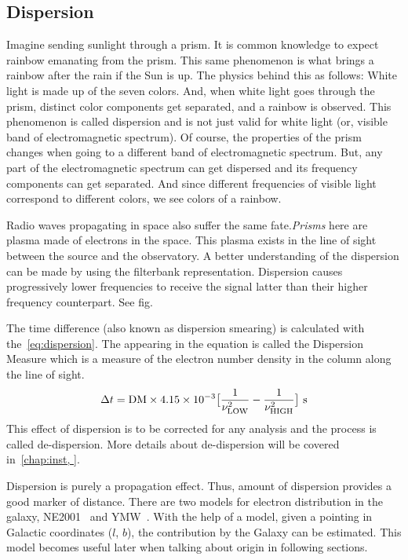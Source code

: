 \subsection{Dispersion}
\label{ssub:dis}

\par Imagine sending sunlight through a prism. It is common knowledge to expect rainbow emanating from the prism. 
This same phenomenon is what brings a rainbow after the rain if the Sun is up. The physics behind this as follows:
White light is made up of the seven colors. And, when white light goes through the prism, distinct color components get separated,
and a rainbow is observed. 
This phenomenon is called dispersion and is not just valid for white light (or, visible band of electromagnetic spectrum). 
Of course, the properties of the prism changes when going to a different band of electromagnetic spectrum. But, any part of the electromagnetic spectrum can get dispersed and its frequency components can get separated. And since different frequencies of visible light correspond to different colors, we see colors of a rainbow.

\par Radio waves propagating in space also suffer the same fate.\emph{Prisms} here are plasma made of electrons in the space. 
This plasma exists in the line of sight between the source and the observatory. A better understanding of the dispersion can be made by using the filterbank representation. Dispersion causes progressively lower frequencies to receive the signal latter than their higher frequency counterpart. See fig.

\par The time difference (also known as dispersion smearing) is calculated with the~\ref{eq:dispersion}. The \dm appearing in the equation is called the Dispersion Measure which is a measure of the electron number density in the column along the line of sight.
\begin{equation}
\label{eq:dispersion}
\Delta t = {\rm DM} \times 4.15 \times 10^{-3} \big[  \frac{1}{\nu^2_{\rm LOW}} - \frac{1}{\nu^2_{\rm HIGH}} \big]\ {\rm s}
\end{equation}
This effect of dispersion is to be corrected for any analysis and the process is called de-dispersion. More details about de-dispersion will be covered in~\autoref{chap:inst, }.

\par Dispersion is purely a propagation effect. Thus, amount of dispersion provides a good marker of distance. There are two models for electron distribution in the galaxy, NE2001~\cite{ne2001} and YMW~\cite{ymw16}. With the help of a model, given a pointing in Galactic coordinates ($l$, $b$), the \dm contribution by the Galaxy can be estimated. This model becomes useful later when talking about \frb{} origin in following sections. 

